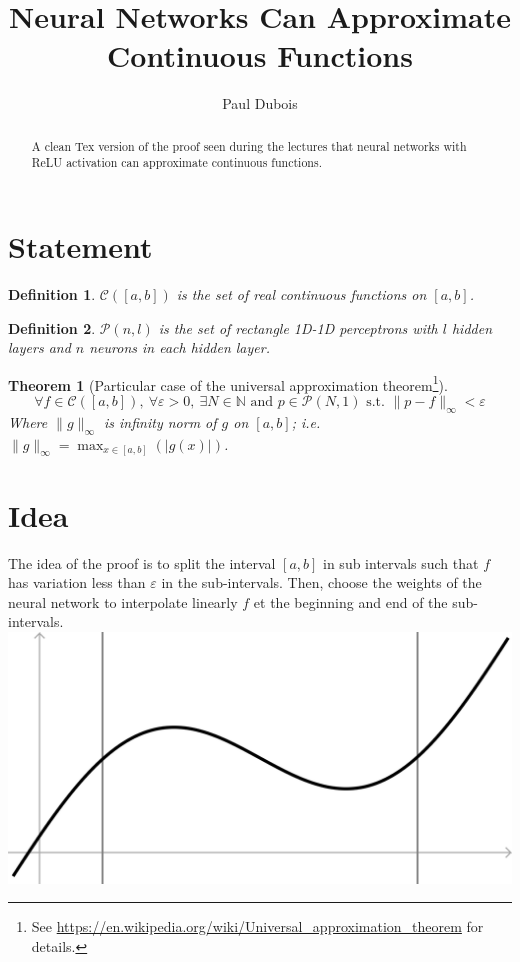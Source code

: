 \documentclass[]{article}
\title{Neural Networks Can Approximate Continuous Functions}
\author{Paul Dubois}
\date{}
\newtheorem*{theorem}{Theorem}
\newtheorem*{definition}{Definition}
\begin{document}
\maketitle

\begin{abstract}
	A clean Tex version of the proof seen during the lectures that neural networks with ReLU activation can approximate continuous functions.
\end{abstract}

\section{Statement}
\begin{definition}
	$\mathcal{C}\left( \left[ a,b \right] \right)$ is the set of real continuous functions on $\left[ a,b \right]$.
\end{definition}
\begin{definition}
	$\mathcal{P}\left( n,l \right)$ is the set of rectangle 1D-1D perceptrons with $l$ hidden layers and $n$ neurons in each hidden layer.
\end{definition}

\begin{theorem}[Particular case of the universal approximation theorem\footnote{See \url{https://en.wikipedia.org/wiki/Universal_approximation_theorem} for details.}]
	$$\forall f \in \mathcal{C}(\left[ a,b \right]), \ \forall \varepsilon > 0, \ \exists N \in \mathbb{N} \text{ and } p \in \mathcal{P}(N,1) \text{ s.t. } \|p-f\|_\infty < \varepsilon$$
	Where $\|g\|_\infty$ is infinity norm of $g$ on $\left[ a,b \right]$; i.e. $\|g\|_\infty = \max_{x \in \left[ a,b \right]}(|g(x)|)$.
\end{theorem}


\section{Idea}
The idea of the proof is to split the interval $\left[ a,b \right]$ in sub intervals such that $f$ has variation less than $\varepsilon$ in the sub-intervals.
Then, choose the weights of the neural network to interpolate linearly $f$ et the beginning and end of the sub-intervals.
\includegraphics[width=\linewidth]{plot}
\end{document}
